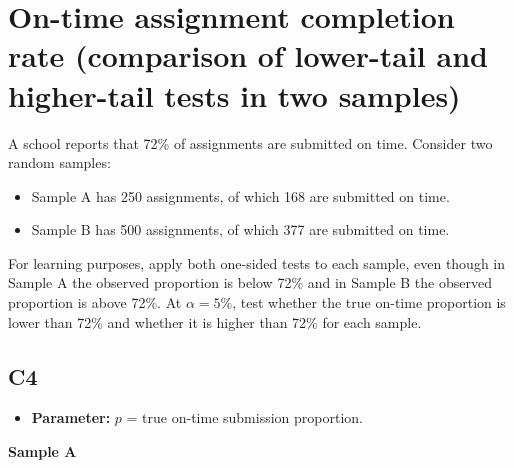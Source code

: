 \begin{center}
\end{center}



\begin{center}
\end{center}


\begin{center}
\end{center}


\section{On-time assignment completion rate (comparison of lower-tail and higher-tail tests in two samples)}
A school reports that 72\% of assignments are submitted on time. Consider two random samples:
\begin{itemize}
	\item Sample A has 250 assignments, of which 168 are submitted on time.
	\item Sample B has 500 assignments, of which 377 are submitted on time.
\end{itemize}
For learning purposes, apply both one-sided tests to each sample, even though in Sample A the observed proportion is below 72\% and in Sample B the observed proportion is above 72\%. At \(\alpha=5\%\), test whether the true on-time proportion is lower than 72\% and whether it is higher than 72\% for each sample.

\subsection*{C4}
\begin{itemize}
	\item \textbf{Parameter:} \(p\) = true on-time submission proportion.
\end{itemize}

\textbf{Sample A}

